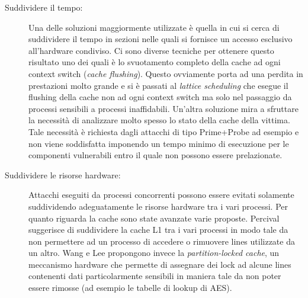 \begin{description}
				\item[Suddividere il tempo:] Una delle soluzioni maggiormente utilizzate è quella in cui si cerca di suddividere il tempo in sezioni nelle quali si fornisce un accesso esclusivo all'hardware condiviso. Ci sono diverse tecniche per ottenere questo risultato uno dei quali è lo svuotamento completo della cache ad ogni context switch (\emph{cache flushing}\cite{zhang2013duppel}). Questo ovviamente porta ad una perdita in prestazioni molto grande e si è passati al \emph{lattice scheduling}\cite{denning1976lattice} che esegue il flushing della cache non ad ogni context switch ma solo nel passaggio da processi sensibili a processi inaffidabili. Un'altra soluzione\cite{varadarajan2014scheduler} mira a sfruttare la necessità di analizzare molto spesso lo stato della cache della vittima. Tale necessità è richiesta dagli attacchi di tipo Prime+Probe ad esempio e non viene soddisfatta imponendo un tempo minimo di esecuzione per le componenti vulnerabili entro il quale non possono essere prelazionate.
				\item[Suddividere le risorse hardware:] Attacchi eseguiti da processi concorrenti possono essere evitati solamente suddividendo adeguatamente le risorse hardware tra i vari processi. Per quanto riguarda la cache sono state avanzate varie proposte. Percival\cite{percival2005cache} suggerisce di suddividere la cache L1 tra i vari processi in modo tale da non permettere ad un processo di accedere o rimuovere lines utilizzate da un altro. Wang e Lee\cite{wang2007new} propongono invece la \emph{partition-locked cache}, un meccanismo hardware che permette di assegnare dei lock ad alcune lines contenenti dati particolarmente sensibili in maniera tale da non poter essere rimosse (ad esempio le tabelle di lookup di \ac{AES}).				 
			\end{description}